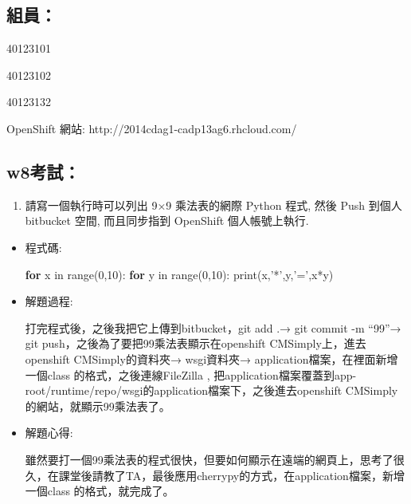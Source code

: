 \documentclass[]{article}
\newenvironment{Shaded}{}{}
\newcommand{\KeywordTok}[1]{\textcolor[rgb]{0.00,0.44,0.13}{\textbf{{#1}}}}
\newcommand{\DataTypeTok}[1]{\textcolor[rgb]{0.56,0.13,0.00}{{#1}}}
\newcommand{\DecValTok}[1]{\textcolor[rgb]{0.25,0.63,0.44}{{#1}}}
\newcommand{\StringTok}[1]{\textcolor[rgb]{0.25,0.44,0.63}{{#1}}}
\newcommand{\NormalTok}[1]{{#1}}
\begin{document}
\subsection{組員：}\label{ux7d44ux54e1}

40123101

40123102

40123132

OpenShift 網站: http://2014cdag1-cadp13ag6.rhcloud.com/

\subsection{w8考試：}\label{w8ux8003ux8a66}

\begin{enumerate}
\def\labelenumi{\arabic{enumi}.}
\itemsep1pt\parskip0pt
\item
  請寫一個執行時可以列出 9×9 乘法表的網際 Python 程式, 然後 Push 到個人
  bitbucket 空間, 而且同步指到 OpenShift 個人帳號上執行.
\end{enumerate}

\begin{itemize}
\item
  程式碼:

\begin{Shaded}
\begin{Highlighting}[]
    \KeywordTok{for} \NormalTok{x in }\DataTypeTok{range}\NormalTok{(}\DecValTok{0}\NormalTok{,}\DecValTok{10}\NormalTok{):}
        \KeywordTok{for} \NormalTok{y in }\DataTypeTok{range}\NormalTok{(}\DecValTok{0}\NormalTok{,}\DecValTok{10}\NormalTok{):}
            \DataTypeTok{print}\NormalTok{(x,}\StringTok{'*'}\NormalTok{,y,}\StringTok{'='}\NormalTok{,x*y)}
\end{Highlighting}
\end{Shaded}
\item
  解題過程:

  打完程式後，之後我把它上傳到bitbucket，git add .→ git commit -m
  ``99''→ git push，之後為了要把99乘法表顯示在openshift
  CMSimply上，進去openshift CMSimply的資料夾→ wsgi資料夾→
  application檔案，在裡面新增一個class 的格式，之後連線FileZilla ,
  把application檔案覆蓋到app-root/runtime/repo/wsgi的application檔案下，之後進去openshift
  CMSimply的網站，就顯示99乘法表了。
\item
  解題心得:

  雖然要打一個99乘法表的程式很快，但要如何顯示在遠端的網頁上，思考了很久，在課堂後請教了TA，最後應用cherrypy的方式，在application檔案，新增一個class
  的格式，就完成了。
\end{itemize}
\end{document}
